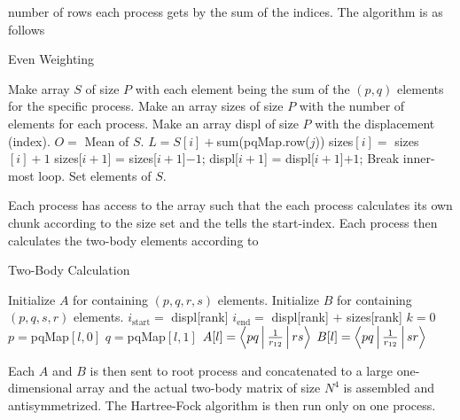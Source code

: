     number of rows each process gets by the sum of the indices. The algorithm
    is as follows
        \begin{algorithm}[H]
            \caption{Even Weighting}\label{alg:parasumweight}
            \begin{algorithmic}[H]
                \State Make array $S$ of size $P$ with each element being the
                sum of the $(p,q)$ elements for the specific process.
                \State Make an array sizes of size $P$ with the number of
                elements for each process.
                \State Make an array displ of size $P$ with the displacement
                (index).
                \State $O =$ Mean of $S$.
                        \State $L = S[i] + $sum(pqMap.row($j$))
                            \State sizes$[i] =$ sizes$[i] + 1$
                            \State sizes[$i+1$] = sizes[$i+1$]$ - 1$;
                            \State displ[$i+1$] = displ[$i+1$]$ + 1$;
                            \State Break inner-most loop.
                        \EndIf
                    \EndFor
                    \State Set elements of $S$.
                \EndFor
            \end{algorithmic}
        \end{algorithm}
    Each process has access to the  array such that the each
    process calculates its own chunk according to the size set and the
     tells the start-index. Each process then calculates the
    two-body elements according to
        \begin{algorithm}[H]
            \caption{Two-Body Calculation}\label{alg:paratwobody}
            \begin{algorithmic}[H]
                \State Initialize $A$ for containing $(p,q,r,s)$ elements.
                \State Initialize $B$ for containing $(p,q,s,r)$ elements.
                \State $i_{\text{start}} =$ displ[rank]
                \State $i_{\text{end}} =$ displ[rank] $+$ sizes[rank]
                \State $k=0$
                            \State $p=$pqMap$[l,0]$
                            \State $q=$pqMap$[l,1]$
                            \State $A[l]=\Braket{pq|\frac{1}{r_{12}}|rs}$
                            \State $B[l]=\Braket{pq|\frac{1}{r_{12}}|sr}$
                        \EndFor
                    \EndFor
                \EndFor
            \end{algorithmic}
        \end{algorithm}
    Each $A$ and $B$ is then sent to root process and concatenated to a large
    one-dimensional array and the actual two-body matrix of size $N^4$ is
    assembled and antisymmetrized. The Hartree-Fock algorithm is then run only
    on one process.


